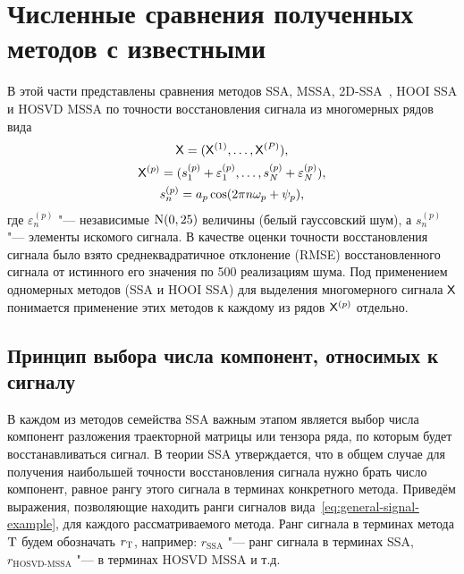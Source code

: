 \documentclass[specialist,
    substylefile = spbu_report.rtx,
    subf,href,colorlinks=true, 12pt]{disser}
\theoremstyle{plain}
\theoremstyle{definition}
\theoremstyle{remark}
\begin{document}
    \section{Численные сравнения полученных методов с известными}\label{sec:numerical-compar}
    В этой части представлены сравнения методов SSA, MSSA, 2D-SSA~\cite{ssa-2020}, HOOI SSA и HOSVD MSSA
    по точности восстановления сигнала из многомерных рядов вида
    \begin{gather}
        \mathsf{X} = (\mathsf{X}^{(1)}, \ldots, \mathsf{X}^{(P)}), \nonumber \\
        \mathsf{X}^{(p)} = (s_1^{(p)} + \varepsilon_1^{(p)}, \ldots, s_N^{(p)} + \varepsilon_N^{(p)}),\nonumber \\
        s_n^{(p)} = a_p \cos(2\pi n \omega_p + \psi_p), \label{eq:general-signal-example}
    \end{gather}
    где $\varepsilon_n^{(p)}$ "--- независимые $\mathrm{N}(0, 25)$ величины (белый гауссовский шум), а
    $s_n^{(p)}$ "--- элементы искомого сигнала.
    В качестве оценки точности восстановления сигнала было взято среднеквадратичное отклонение (RMSE)
    восстановленного сигнала от истинного его значения по 500 реализациям шума.
    Под применением одномерных методов (SSA и HOOI SSA) для выделения многомерного сигнала $\mathsf{X}$ понимается
    применение этих методов к каждому из рядов $\mathsf{X}^{(p)}$ отдельно.

    \subsection{Принцип выбора числа компонент, относимых к сигналу}\label{subsec:example-signal-ranks}
    В каждом из методов семейства SSA важным этапом является выбор числа компонент разложения траекторной матрицы
    или тензора ряда, по которым будет восстанавливаться сигнал.
    В теории SSA утверждается, что в общем случае для получения наибольшей точности восстановления
    сигнала нужно брать число компонент, равное рангу этого сигнала в терминах конкретного метода.
    Приведём выражения, позволяющие находить ранги сигналов вида~\eqref{eq:general-signal-example}, для каждого
    рассматриваемого метода.
    Ранг сигнала в терминах метода $\mathrm{T}$ будем обозначать $r_{\mathrm{T}}$, например: $r_\text{SSA}$ "---
    ранг сигнала в терминах SSA, $r_\text{HOSVD-MSSA}$ "--- в терминах HOSVD MSSA и т.д.
\end{document}
